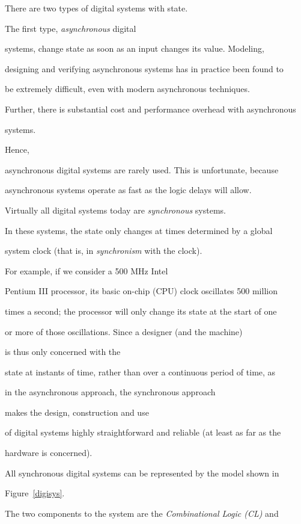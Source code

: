\documentclass[12pt,dvips]{article}
\begin{document}
There are two types of digital systems with state.

The first type, {\it asynchronous} digital

systems, change state as soon as an input changes its value. Modeling,

designing and verifying asynchronous systems has in practice been found to

be extremely difficult, even with modern asynchronous techniques.

Further, there is substantial cost and performance overhead with asynchronous

systems\cite{Flynn99}.

Hence,

asynchronous digital systems are rarely used. This is unfortunate, because

asynchronous systems operate as fast as the logic delays will allow.



Virtually all digital systems today are {\it synchronous} systems.

In these systems, the state only changes at times determined by a global

system clock (that is, in {\it synchronism} with the clock).

For example, if we consider a 500 MHz Intel

Pentium III processor, its basic on-chip (CPU) clock oscillates 500 million

times a second; the processor will only change its state at the start of one

or more of those oscillations. Since a designer (and the machine)

is thus only concerned with the

state at instants of time, rather than over a continuous period of time, as

in the asynchronous approach, the synchronous approach

makes the design, construction and use

of digital systems highly straightforward and reliable (at least as far as the

hardware is concerned).




All synchronous digital systems can be represented by the model shown in

Figure~\ref{digisys}.

The two components to the system are the {\it Combinational Logic (CL)} and
\end{document}
